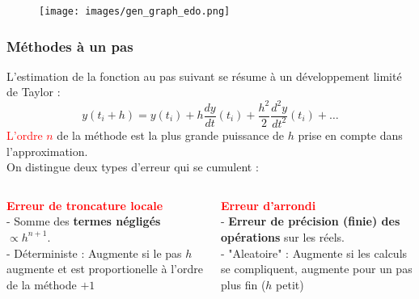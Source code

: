 \documentclass{beamer}
\begin{document}
\begin{frame}
\begin{figure}
\texttt{[image: images/gen\_graph\_edo.png]}
\end{figure}
\end{frame}



\begin{frame}
\frametitle{Méthodes à un pas}
L'estimation de la fonction au pas suivant se résume à un développement limité de Taylor :
\begin{equation*}
	y(t_i + h) = y(t_i) + h \frac{dy}{dt}(t_i) + \frac{h^2}{2}\frac{d^2y}{dt^2}(t_i) + \dots
\end{equation*}
\textcolor{red}{L'ordre $n$} de la méthode est la plus grande puissance de $h$ prise en compte dans l'approximation.\\
\vspace{0.4cm}
On distingue deux types d'erreur qui se cumulent :\\
\vspace{0.3cm}
\begin{columns}[t]
\small
\begin{column}{0.48\textwidth}
\textcolor{red}{\textbf{Erreur de troncature locale}}\\
\vspace{0.2cm}
- Somme des \textbf{termes négligés} $\propto h^{n+1}$.\\
- Déterministe : Augmente si le pas $h$ augmente et est proportionelle à l'ordre de la méthode $+ 1$
\end{column}
%
\begin{column}{0.48\textwidth}
\textcolor{red}{\textbf{Erreur d'arrondi}}\\
\vspace{0.2cm}
- \textbf{Erreur de précision (finie) des opérations} sur les réels.\\
- "Aleatoire" : Augmente si les calculs se compliquent, augmente pour un pas plus fin ($h$ petit)
\end{column}
\end{columns}

\end{frame}
\end{document}
